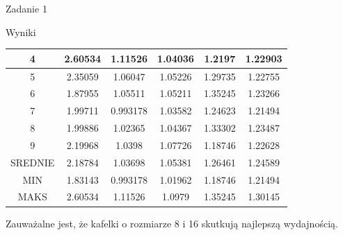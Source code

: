 \documentclass[11pt,wide]{mwart}
\begin{document}
\begin{section}{Zadanie 1}
\begin{subsection}{Wyniki}
\begin{center}
\begin{tabular}{|c|c|c|c|c|c|}
4 & 2.60534 & 1.11526 & 1.04036 & 1.2197 & 1.22903\\
\hline
5 & 2.35059 & 1.06047 & 1.05226 & 1.29735 & 1.22755\\
\hline
6 & 1.87955 & 1.05511 & 1.05211 & 1.35245 & 1.23266\\
\hline
7 & 1.99711 & 0.993178 & 1.03582 & 1.24623 & 1.21494\\
\hline
8 & 1.99886 & 1.02365 & 1.04367 & 1.33302 & 1.23487\\
\hline
9 & 2.19968 & 1.0398 & 1.07726 & 1.18746 & 1.22628\\
\hline
SREDNIE & 2.18784 & 1.03698 & 1.05381 & 1.26461 & 1.24589\\
\hline
MIN & 1.83143 & 0.993178 & 1.01962 & 1.18746 & 1.21494\\
\hline
MAKS & 2.60534 & 1.11526 & 1.0979 & 1.35245 & 1.30145\\
\hline
\end{tabular}
\end{center}
Zauważalne jest, że kafelki o rozmiarze 8 i 16 skutkują najlepszą wydajnością.
   \end{subsection}
 \end{section}
\end{document}
